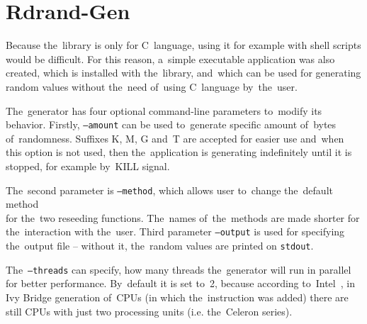 
\chapter{Rdrand-Gen} \label{chap:generator}
\par{
Because the~library is only for C~language, using it for example with shell scripts would be difficult. For this reason, a~simple executable application was also created, which is installed with the~library, and~which can be used for generating random values without the~need of~using C~language by~the~user.
}

\par{
The~generator has four optional command-line parameters to~modify its behavior. Firstly, {\tt --amount} can be used to~generate specific amount of~bytes of~randomness. Suffixes K, M, G and~T are accepted for easier use and~when this option is not used, then the~application is generating indefinitely until it is stopped, for example by~KILL signal.
}

\par{
The~second parameter is {\tt --method}, which allows user to~change the~default method \\ for the~two reseeding functions. The~names of~the~methods are made shorter for the~interaction with the~user. Third parameter {\tt --output} is used for specifying the~output file -- without it, the~random values are printed on {\tt stdout}. 
}

\par{
The~{\tt --threads} can specify, how many threads the~generator will run in parallel for better performance. By~default it is set to~2, because according to~Intel~\cite{IntelArk}, in Ivy Bridge generation of~CPUs (in which the~instruction was added) there are still CPUs with just two processing units (i.e. the~Celeron series).
}

